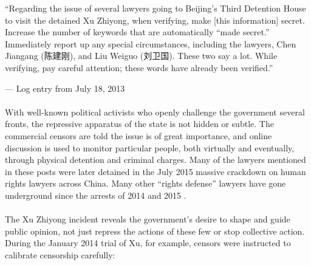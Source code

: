 \documentclass[12pt]{article}
\begin{document}
\begin{CJK*}{UTF8}{gbsn}
{
\epigraph{``Regarding the issue of several lawyers going to Beijing's Third Detention House to visit the detained Xu Zhiyong, when verifying, make [this information] secret. Increase the number of keywords that are automatically ``made secret.'' Immediately report up any special circumstances, including the lawyers, Chen Jiangang (陈建刚), and Liu Weiguo (刘卫国). These two say a lot. While verifying, pay careful attention; these words have already been verified.''\footnotemark\newline}{--- Log entry from July 18, 2013}}

\paragraph{} With well-known political activists who openly challenge the government several fronts, the repressive apparatus of the state is not hidden or subtle. The commercial censors are told the issue is of great importance, and online discussion is used to monitor particular people, both virtually and eventually, through physical detention and criminal charges. Many of the lawyers mentioned in these posts were later detained in the July 2015 massive crackdown on human rights lawyers across China. Many other ``rights defense'' lawyers have gone underground since the arrests of 2014 and 2015 \citep{pils2014china}.

\paragraph{} The Xu Zhiyong incident reveals the government's desire to shape and guide public opinion, not just repress the actions of these few or stop collective action. During the January 2014 trial of Xu, for example, censors were instructed to calibrate censorship carefully:


\end{CJK*}
\end{document}
